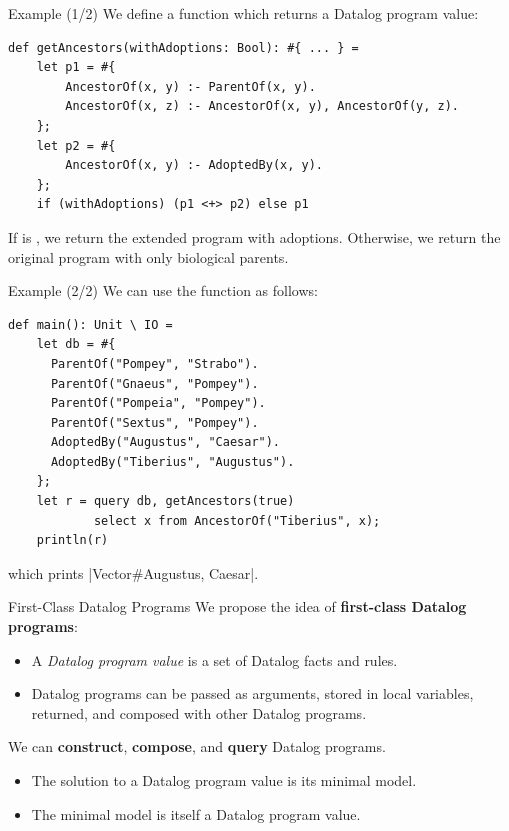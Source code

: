 \begin{frame}[fragile]{Example (1/2)}
We define a function which returns a Datalog program value:

\begin{lstlisting}[language=flix, xleftmargin=0.8cm]
def getAncestors(withAdoptions: Bool): #{ ... } =
    let p1 = #{
        AncestorOf(x, y) :- ParentOf(x, y).
        AncestorOf(x, z) :- AncestorOf(x, y), AncestorOf(y, z).
    };
    let p2 = #{
        AncestorOf(x, y) :- AdoptedBy(x, y). 
    };
    if (withAdoptions) (p1 <+> p2) else p1
\end{lstlisting}

If  is , we return the extended program with
adoptions. Otherwise, we return the original program with only biological
parents.
\end{frame}

\begin{frame}[fragile]{Example (2/2)}
We can use the  function as follows:

\begin{lstlisting}[language=flix, xleftmargin=0.8cm]
def main(): Unit \ IO = 
    let db = #{
      ParentOf("Pompey", "Strabo").
      ParentOf("Gnaeus", "Pompey").
      ParentOf("Pompeia", "Pompey").
      ParentOf("Sextus", "Pompey").
      AdoptedBy("Augustus", "Caesar").
      AdoptedBy("Tiberius", "Augustus").
    };
    let r = query db, getAncestors(true) 
            select x from AncestorOf("Tiberius", x);
    println(r)
\end{lstlisting}

which prints \Code|Vector#{Augustus, Caesar}|.
\end{frame}

\begin{frame}{First-Class Datalog Programs}
We propose the idea of \textbf{first-class Datalog programs}:

\begin{itemize}
    \item A \emph{Datalog program value} is a set of Datalog facts and rules.
    \item Datalog programs can be passed as arguments, stored in local
    variables, returned, and composed with other Datalog programs.
\end{itemize}

\pause

We can \textbf{construct}, \textbf{compose}, and \textbf{query} Datalog programs.

\begin{itemize}
    \item The solution to a Datalog program value is its minimal model.
    \item The minimal model is itself a Datalog program value.
\end{itemize}
\end{frame}

